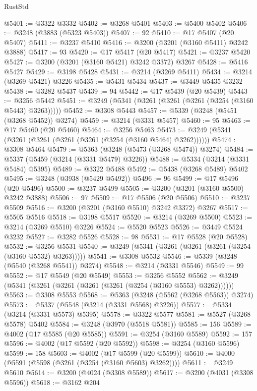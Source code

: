 \begin{lexlean}{RustStd}
\begin{coremodule}
{\begin{coremodule}
{{{{{{{{{{{{{{{{{{{{{{{{{@5401 := @3322 @3332
@5402 := @3268 @5401
@5403 := @5400 @5402
@5406 := @3248 (@3883 (@5323 @5403))
@5407 := 92
@5410 := @17 @5407 (@20 @5407)
@5411 := @3237 @5410
@5416 := @3200 (@3201 (@3160 @5411) @3242 @3888)
@5417 := 93
@5420 := @17 @5417 (@20 @5417)
@5421 := @3237 @5420
@5427 := @3200 (@3201 (@3160 @5421) @3242 @3372) @3267
@5428 := @5416 @5427
@5429 := @3198 @5428
@5431 := @3214 (@3269 @5411)
@5434 := @3214 (@3269 @5421) @3226
@5435 := @5431 @5434
@5437 := @3449 @5435 @3232
@5438 := @3282 @5437
@5439 := 94
@5442 := @17 @5439 (@20 @5439)
@5443 := @3256 @5442
@5451 := @3249 (@5341 (@3261 (@3261 (@3261 (@3254 (@3160 @5443) @3263)))))
@5452 := @3308 @5443
@5457 := @5339 (@3248 (@5451 (@3268 @5452)) @3274)
@5459 := @3214 (@3331 @5457)
@5460 := 95
@5463 := @17 @5460 (@20 @5460)
@5464 := @3256 @5463
@5473 := @3249 (@5341 (@3261 (@3261 (@3261 (@3261 (@3254 (@3160 @5464) @3262))))))
@5474 := @3308 @5464
@5479 := @5363 (@3248 (@5473 (@3268 @5474)) @3274)
@5484 := @5337 (@5459 (@3214 (@3331 @5479) @3226))
@5488 := @5334 (@3214 (@3331 @5484) @5395)
@5489 := @3322 @5488
@5492 := @5438 (@3268 @5489) @5402
@5495 := @3248 (@3938 (@5429 @5492))
@5496 := 96
@5499 := @17 @5496 (@20 @5496)
@5500 := @3237 @5499
@5505 := @3200 (@3201 (@3160 @5500) @3242 @3888)
@5506 := 97
@5509 := @17 @5506 (@20 @5506)
@5510 := @3237 @5509
@5516 := @3200 (@3201 (@3160 @5510) @3242 @3372) @3267
@5517 := @5505 @5516
@5518 := @3198 @5517
@5520 := @3214 (@3269 @5500)
@5523 := @3214 (@3269 @5510) @3226
@5524 := @5520 @5523
@5526 := @3449 @5524 @3232
@5527 := @3282 @5526
@5528 := 98
@5531 := @17 @5528 (@20 @5528)
@5532 := @3256 @5531
@5540 := @3249 (@5341 (@3261 (@3261 (@3261 (@3254 (@3160 @5532) @3263)))))
@5541 := @3308 @5532
@5546 := @5339 (@3248 (@5540 (@3268 @5541)) @3274)
@5548 := @3214 (@3331 @5546)
@5549 := 99
@5552 := @17 @5549 (@20 @5549)
@5553 := @3256 @5552
@5562 := @3249 (@5341 (@3261 (@3261 (@3261 (@3261 (@3254 (@3160 @5553) @3262))))))
@5563 := @3308 @5553
@5568 := @5363 (@3248 (@5562 (@3268 @5563)) @3274)
@5573 := @5337 (@5548 (@3214 (@3331 @5568) @3226))
@5577 := @5334 (@3214 (@3331 @5573) @5395)
@5578 := @3322 @5577
@5581 := @5527 (@3268 @5578) @5402
@5584 := @3248 (@3970 (@5518 @5581))
@5585 := 156
@5589 := @4002 (@17 @5585 (@20 @5585))
@5591 := @3254 (@3160 @5589)
@5592 := 157
@5596 := @4002 (@17 @5592 (@20 @5592))
@5598 := @3254 (@3160 @5596)
@5599 := 158
@5603 := @4002 (@17 @5599 (@20 @5599))
@5610 := @4000 (@5591 (@5598 (@3261 (@3254 (@3160 @5603) @3262))))
@5611 := @3249 @5610
@5614 := @3200 (@4024 (@3308 @5589))
@5617 := @3200 (@4031 (@3308 @5596))
@5618 := @3162 @204
}}}}}}}}}}}}}}}}}}}}}}}}}
\end{coremodule}}
\end{coremodule}
\end{lexlean}

